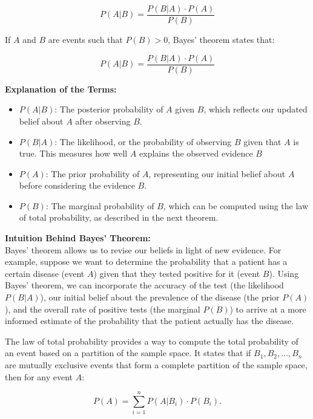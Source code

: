 \[
P(A|B) = \frac{P(B|A) \cdot P(A)}{P(B)}
\]

\begin{theorem}
    If \( A \) and \( B \) are events such that \( P(B) > 0 \), Bayes' theorem states that:

\[
P(A|B) = \frac{P(B|A) \cdot P(A)}{P(B)}
\]
\end{theorem}

\textbf{Explanation of the Terms:}

\begin{itemize}
    \item \( P(A|B) \): The posterior probability of \( A \) given \( B \), which reflects our updated belief about \( A \) after observing \( B \).
    \item \( P(B|A) \): The likelihood, or the probability of observing \( B \) given that \( A \) is true. This measures how well \( A \) explains the observed evidence \( B \)
    \item \( P(A) \): The prior probability of \( A \), representing our initial belief about \( A \) before considering the evidence \( B \).
    \item \( P(B) \): The marginal probability of \( B \), which can be computed using the law of total probability, as described in the next theorem.
\end{itemize}

\textbf{Intuition Behind Bayes' Theorem:}\\

Bayes' theorem allows us to revise our beliefs in light of new evidence. For example, suppose we want to determine the probability that a patient has a certain disease (event \( A \)) given that they tested positive for it (event \( B \)). Using Bayes' theorem, we can incorporate the accuracy of the test (the likelihood \( P(B|A) \)), our initial belief about the prevalence of the disease (the prior \( P(A) \)), and the overall rate of positive tests (the marginal \( P(B) \)) to arrive at a more informed estimate of the probability that the patient actually has the disease.

\begin{theorem}
    The law of total probability provides a way to compute the total probability of an event based on a partition of the sample space. It states that if \( B_1, B_2, \ldots, B_n \) are mutually exclusive events that form a complete partition of the sample space, then for any event \( A \):

\[
P(A) = \sum_{i=1}^n P(A|B_i) \cdot P(B_i).
\]
\end{theorem}

